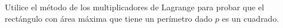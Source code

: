 \item Utilice el método de los multiplicadores de Lagrange para probar que el rectángulo con área máxima que tiene un perímetro dado $p$ es un cuadrado.
